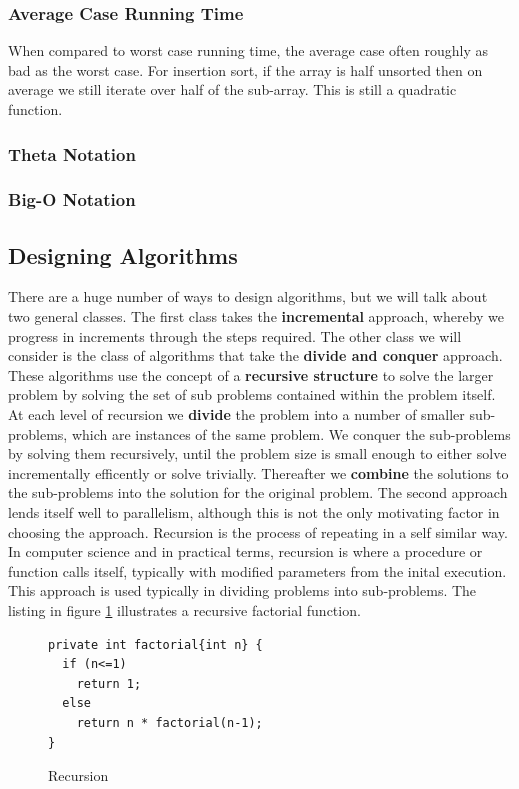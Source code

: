 \documentclass[10pt,a4paper]{article}
\begin{document}
\subsubsection{Average Case Running Time}
When compared to worst case running time, the average case often roughly as bad as the worst case. For insertion sort, if the array is half unsorted then on average we still iterate over half of the sub-array. This is still a quadratic function. 
\subsubsection{Theta Notation}
\subsubsection{Big-O Notation} 
\subsection{Designing Algorithms}
There are a huge number of ways to design algorithms, but we will talk about two general classes. The first class takes the {\bf incremental} approach, whereby we progress in increments through the steps required. The other class we will consider is the class of algorithms that take the {\bf divide and conquer} approach. These algorithms use the concept of a {\bf recursive structure} to solve the larger problem by solving the set of sub problems contained within the problem itself. At each level of recursion we {\bf divide} the problem into a number of smaller sub-problems, which are instances of the same problem. We conquer the sub-problems by solving them recursively, until the problem size is small enough to either solve incrementally efficently or solve trivially. Thereafter we {\bf combine} the solutions  to the sub-problems into the solution for the original problem. The second approach lends itself well to parallelism, although this is not the only motivating factor in choosing the approach. 
\newline\newline
Recursion is the process of repeating in a self similar way. In computer science and in practical terms, recursion is where a procedure or function calls itself, typically with modified parameters from the inital execution. This approach is used typically in dividing problems into sub-problems. The listing in figure \ref{faclisting} illustrates a recursive factorial function. 

\begin{figure}
\caption{Recursion}
\begin{center}
\begin{lstlisting}
private int factorial{int n} {
  if (n<=1) 
    return 1;
  else 
    return n * factorial(n-1);
}
\end{lstlisting}
\label{faclisting}
\end{center}
\end{figure}
\end{document}
